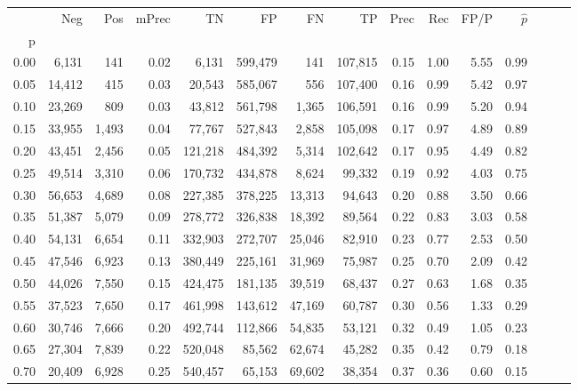 \begin{tabular}{rrrrrrrrrrrrrrr}
\toprule
{} &     Neg &    Pos & mPrec &       TN &       FP &       FN &       TP &  Prec &   Rec &  FP/P & $\hat{p}$ \\
p    &         &        &       &          &          &          &          &       &       &       &           \\
\midrule
0.00 &   6,131 &    141 &  0.02 &    6,131 &  599,479 &      141 &  107,815 &  0.15 &  1.00 &  5.55 &      0.99 \\
0.05 &  14,412 &    415 &  0.03 &   20,543 &  585,067 &      556 &  107,400 &  0.16 &  0.99 &  5.42 &      0.97 \\
0.10 &  23,269 &    809 &  0.03 &   43,812 &  561,798 &    1,365 &  106,591 &  0.16 &  0.99 &  5.20 &      0.94 \\
0.15 &  33,955 &  1,493 &  0.04 &   77,767 &  527,843 &    2,858 &  105,098 &  0.17 &  0.97 &  4.89 &      0.89 \\
0.20 &  43,451 &  2,456 &  0.05 &  121,218 &  484,392 &    5,314 &  102,642 &  0.17 &  0.95 &  4.49 &      0.82 \\
0.25 &  49,514 &  3,310 &  0.06 &  170,732 &  434,878 &    8,624 &   99,332 &  0.19 &  0.92 &  4.03 &      0.75 \\
0.30 &  56,653 &  4,689 &  0.08 &  227,385 &  378,225 &   13,313 &   94,643 &  0.20 &  0.88 &  3.50 &      0.66 \\
0.35 &  51,387 &  5,079 &  0.09 &  278,772 &  326,838 &   18,392 &   89,564 &  0.22 &  0.83 &  3.03 &      0.58 \\
0.40 &  54,131 &  6,654 &  0.11 &  332,903 &  272,707 &   25,046 &   82,910 &  0.23 &  0.77 &  2.53 &      0.50 \\
0.45 &  47,546 &  6,923 &  0.13 &  380,449 &  225,161 &   31,969 &   75,987 &  0.25 &  0.70 &  2.09 &      0.42 \\
0.50 &  44,026 &  7,550 &  0.15 &  424,475 &  181,135 &   39,519 &   68,437 &  0.27 &  0.63 &  1.68 &      0.35 \\
0.55 &  37,523 &  7,650 &  0.17 &  461,998 &  143,612 &   47,169 &   60,787 &  0.30 &  0.56 &  1.33 &      0.29 \\
0.60 &  30,746 &  7,666 &  0.20 &  492,744 &  112,866 &   54,835 &   53,121 &  0.32 &  0.49 &  1.05 &      0.23 \\
0.65 &  27,304 &  7,839 &  0.22 &  520,048 &   85,562 &   62,674 &   45,282 &  0.35 &  0.42 &  0.79 &      0.18 \\
0.70 &  20,409 &  6,928 &  0.25 &  540,457 &   65,153 &   69,602 &   38,354 &  0.37 &  0.36 &  0.60 &      0.15 \\

\end{tabular}
